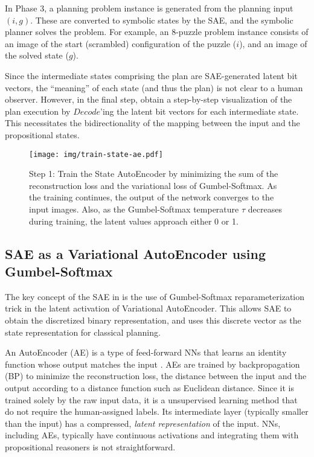 In Phase 3, a planning problem instance is generated from the planning input $(i,g)$.
These are converted to symbolic states by the SAE, and the symbolic planner solves the problem.
For example, an 8-puzzle problem instance consists of an image of the start (scrambled) configuration of the puzzle ($i$), and an image of the solved state ($g$).

Since the intermediate states comprising the plan are SAE-generated latent bit vectors, the ``meaning'' of each state (and thus the plan) is not clear to a human observer.
However, in the final step, \latentplanner obtain a step-by-step visualization of the plan execution
by $Decode$'ing the latent bit vectors for each intermediate state.
This necessitates the bidirectionality of the mapping between the input and the propositional states.

\begin{figure}[htb]
 \texttt{[image: img/train-state-ae.pdf]}
 \caption{Step 1:
Train the State AutoEncoder by
 minimizing the sum of the reconstruction loss and the variational loss of Gumbel-Softmax.
As the training continues, the output of the network converges to the input images.
Also, as the Gumbel-Softmax temperature $\tau$ decreases during training,
the latent values approach either 0 or 1.}
 \label{sae}
\end{figure}

\subsection{SAE as a Variational AutoEncoder using Gumbel-Softmax}

The key concept of the SAE in \latentplanner is the use of Gumbel-Softmax \cite{jang2016categorical}
reparameterization trick in the latent activation of Variational AutoEncoder.
This allows SAE to obtain the
discretized binary representation, and \latentplanner uses this
discrete vector as the state representation for classical planning.

An AutoEncoder (AE) is a type of feed-forward NNs that learns
an identity function whose output matches the input \cite{hinton2006reducing}.
AEs are trained by backpropagation (BP) to minimize the reconstruction loss,
the distance between the input and the output according to a distance function such as Euclidean distance.
Since it is trained solely by the raw input data, it is a unsupervised learning method that do not require the human-assigned labels.
Its intermediate layer (typically smaller than the input) has a compressed, \emph{latent representation} of the input.
NNs, including AEs, typically have continuous activations and integrating them with propositional reasoners is not straightforward.

